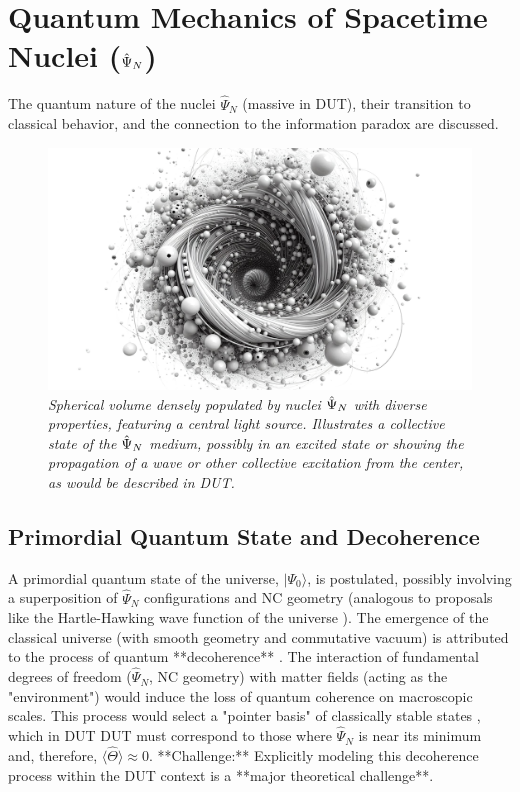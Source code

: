 \documentclass[11pt, a4paper]{article}
\theoremstyle{remark}
\newcommand{\Op}[1]{\hat{#1}}
\begin{document}
\section{Quantum Mechanics of Spacetime Nuclei (\texorpdfstring{\(\protect\Op{\Psi}_N\)}{PsiN})}
\label{sec:mecanica_cuantica_psi_n_final}

The quantum nature of the nuclei \( \Op{\Psi}_N \) (massive in DUT), their transition to classical behavior, and the connection to the information paradox are discussed.

\begin{figure}[htbp]
    \centering
    \includegraphics[width=0.6\linewidth]{OIG15.ZNLJ.PNG}
    \caption{%
        \footnotesize\textit{Spherical volume densely populated by nuclei \(\protect\Op{\Psi}_N\) with diverse properties, featuring a central light source. Illustrates a collective state of the \(\protect\Op{\Psi}_N\) medium, possibly in an excited state or showing the propagation of a wave or other collective excitation from the center, as would be described in DUT.}
    }
    \label{fig:Figura10}
\end{figure}


\subsection{Primordial Quantum State and Decoherence}
\label{sec:decoherence_final}
A primordial quantum state of the universe, \(|\Psi_0\rangle\), is postulated, possibly involving a superposition of \( \Op{\Psi}_N \) configurations and NC geometry (analogous to proposals like the Hartle-Hawking wave function of the universe \citep{HartleHawking1983WFU}). The emergence of the classical universe (with smooth geometry and commutative vacuum) is attributed to the process of quantum **decoherence** \citep{ZurekDecoherenceReview, JoosZehDecoherenceBook, KieferQuantumGravityBook}. The interaction of fundamental degrees of freedom (\( \Op{\Psi}_N \), NC geometry) with matter fields (acting as the "environment") would induce the loss of quantum coherence on macroscopic scales. This process would select a "pointer basis" of classically stable states \citep{ZurekPointerBasis, Kiefer:2008sw}, which in DUT DUT must correspond to those where \( \Op{\Psi}_N \) is near its minimum and, therefore, \( \langle \Op{\Theta} \rangle \approx 0 \).
**Challenge:** Explicitly modeling this decoherence process within the DUT context is a **major theoretical challenge**.
\end{document}
